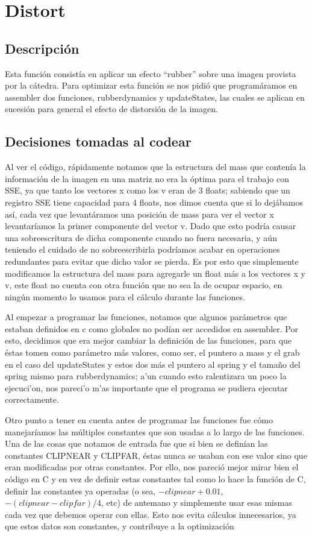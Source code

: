 \documentclass[a4paper,10pt]{article}
\begin{document}
\section{Distort}

\subsection{Descripción}

Esta función consistía en aplicar un efecto ``rubber'' sobre una imagen provista por la cátedra. Para optimizar esta función se nos pidió que programáramos en assembler dos funciones, rubberdynamics y updateStates, las cuales se aplican en sucesión para general el efecto de distorsión de la imagen.

\subsection{Decisiones tomadas al codear}

Al ver el código, rápidamente notamos que la estructura del mass que contenía la información de la imagen en una matriz no era la óptima para el trabajo con SSE, ya que tanto los vectores x como los v eran de 3 floats; sabiendo que un registro SSE tiene capacidad para 4 floats, nos dimos cuenta que si lo dejábamos así, cada vez que levantáramos una posición de mass para ver el vector x levantaríamos la primer componente del vector v. Dado que esto podría causar una sobreescritura de dicha componente cuando no fuera necesaria, y aún teniendo el cuidado de no sobreescribirla podríamos acabar en operaciones redundantes para evitar que dicho valor se pierda. Es por esto que simplemente modificamos la estructura del mass para agregarle un float más a los vectores x y v, este float no cuenta con otra función que no sea la de ocupar espacio, en ningún momento lo usamos para el cálculo durante las funciones.

Al empezar a programar las funciones, notamos que algunos parámetros que estaban definidos en c como globales no podían ser accedidos en assembler. Por esto, decidimos que era mejor cambiar la definición de las funciones, para que éstas tomen como parámetro más valores, como ser, el puntero a mass y el grab en el caso del updateStates y estos dos más el puntero al spring y el tamaño del spring mismo para rubberdynamics; a'un cuando esto ralentizara un poco la ejecuci'on, nos pareci'o m'as importante que el programa se pudiera ejecutar correctamente.

Otro punto a tener en cuenta antes de programar las funciones fue cómo manejaríamos las múltiples constantes que son usadas a lo largo de las funciones. Una de las cosas que notamos de entrada fue que si bien se definían las constantes CLIPNEAR y CLIPFAR, éstas nunca se usaban con ese valor sino que eran modificadas por otras constantes. Por ello, nos pareció mejor mirar bien el código en C y en vez de definir estas constantes tal como lo hace la función de C, definir las constantes ya operadas (o sea, $-clipnear +0.01$, $ -(clipnear-clipfar)/4$, etc) de antemano y simplemente usar esas mismas cada vez que debemos operar con ellas. Esto nos evita cálculos innecesarios, ya que estos datos son constantes, y contribuye a la optimización
\end{document}
